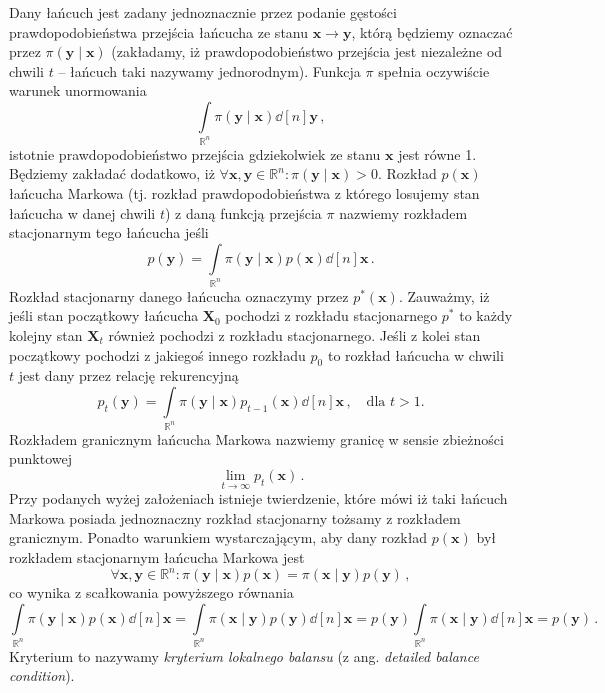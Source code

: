\documentclass{myclass}
\numberwithin{equation}{subsection}
\begin{document}
Dany łańcuch jest zadany jednoznacznie przez podanie gęstości prawdopodobieństwa przejścia łańcucha
ze stanu \(\bm{x} \to \bm{y}\), którą będziemy oznaczać przez \(\pi(\bm{y} \mid \bm{x})\)
(zakładamy, iż prawdopodobieństwo przejścia jest niezależne od chwili \(t\) -- łańcuch taki nazywamy
jednorodnym). Funkcja \(\pi\) spełnia oczywiście warunek unormowania
\begin{equation}
    \int\limits_{\mathbb{R}^n} \pi(\bm{y} \mid \bm{x}) \dd[n]{\bm{y}}\,,
\end{equation} 
istotnie prawdopodobieństwo przejścia gdziekolwiek ze stanu \(\bm{x}\) jest równe 1. Będziemy
zakładać dodatkowo, iż \(\forall \bm{x},\bm{y}\in\mathbb{R}^n: \pi(\bm{y} \mid \bm{x}) > 0\).
Rozkład \(p(\bm{x})\) łańcucha Markowa (tj. rozkład prawdopodobieństwa z którego losujemy stan
łańcucha w danej chwili \(t\)) z daną funkcją przejścia \(\pi\) nazwiemy rozkładem stacjonarnym tego
łańcucha jeśli
\begin{equation}
    p(\bm{y}) = \int\limits_{\mathbb{R}^n} \pi(\bm{y} \mid \bm{x})p(\bm{x}) \dd[n]{\bm{x}}\,.
\end{equation}
Rozkład stacjonarny danego łańcucha oznaczymy przez \(p^*(\bm{x})\). Zauważmy, iż jeśli stan
początkowy łańcucha \(\bm{X}_0\) pochodzi z rozkładu stacjonarnego \(p^*\) to każdy kolejny stan
\(\bm{X}_t\) również pochodzi z rozkładu stacjonarnego. Jeśli z kolei stan początkowy pochodzi z
jakiegoś innego rozkładu \(p_0\) to rozkład łańcucha w chwili \(t\) jest dany przez relację
rekurencyjną
\begin{equation}
    p_t(\bm{y}) = \int\limits_{\mathbb{R}^n} \pi(\bm{y} \mid \bm{x})p_{t-1}(\bm{x}) \dd[n]{\bm{x}}\,,\quad\text{dla \(t > 1\).}
\end{equation}
Rozkładem granicznym łańcucha Markowa nazwiemy granicę w sensie zbieżności punktowej
\begin{equation}
    \lim_{t\to\infty} p_t(\bm{x})\,.
\end{equation}
Przy podanych wyżej założeniach istnieje twierdzenie, które mówi iż taki łańcuch Markowa posiada
jednoznaczny rozkład stacjonarny tożsamy z rozkładem granicznym. Ponadto warunkiem wystarczającym,
aby dany rozkład \(p(\bm{x})\) był rozkładem stacjonarnym łańcucha Markowa jest
\begin{equation}
    \forall\bm{x}, \bm{y} \in \mathbb{R}^n: \pi(\bm{y}\mid\bm{x}) p(\bm{x}) = \pi(\bm{x} \mid \bm{y}) p(\bm{y})\,,
\end{equation}
co wynika z scałkowania powyższego równania
\begin{equation}
    \int\limits_{\mathbb{R}^n} \pi(\bm{y}\mid\bm{x}) p(\bm{x}) \dd[n]{\bm{x}} = \int\limits_{\mathbb{R}^n} \pi(\bm{x} \mid \bm{y}) p(\bm{y}) \dd[n]{\bm{x}} = p(\bm{y}) \int\limits_{\mathbb{R}^n} \pi(\bm{x} \mid \bm{y}) \dd[n]{\bm{x}} = p(\bm{y})\,.
\end{equation}
Kryterium to nazywamy \emph{kryterium lokalnego balansu} (z ang. \textit{detailed balance
condition}).
\end{document}
